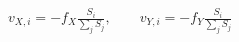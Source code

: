 \documentclass[border=3pt]{standalone}
\begin{document}
\color{ink}\fontsize{25}{32}\selectfont
$\displaystyle v_{X,i}=-f_X\frac{S_i}{\sum_j S_j},\qquad v_{Y,i}=-f_Y\frac{S_i}{\sum_j S_j}$
\end{document}
